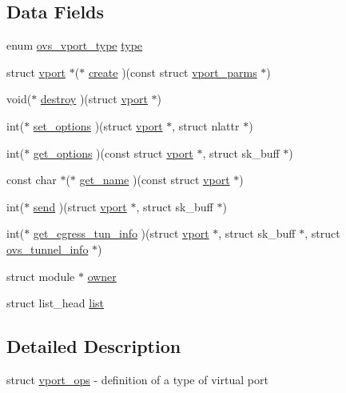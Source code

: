 \subsection*{Data Fields}
\begin{DoxyCompactItemize}
\item 
enum \hyperlink{openvswitch_8h_a9a1b861aa99bd83177a2b10b34745b0a}{ovs\+\_\+vport\+\_\+type} \hyperlink{structvport__ops_a7dd0d3776e78a2885063d3afd5e78148}{type}
\item 
struct \hyperlink{structvport}{vport} $\ast$($\ast$ \hyperlink{structvport__ops_acf3642d1a18755d25c37e9634c6945a2}{create} )(const struct \hyperlink{structvport__parms}{vport\+\_\+parms} $\ast$)
\item 
void($\ast$ \hyperlink{structvport__ops_a4fd321083545d82f308dc78331649632}{destroy} )(struct \hyperlink{structvport}{vport} $\ast$)
\item 
int($\ast$ \hyperlink{structvport__ops_a2a99b53de4cfaeaf8fb88d41660f5e73}{set\+\_\+options} )(struct \hyperlink{structvport}{vport} $\ast$, struct nlattr $\ast$)
\item 
int($\ast$ \hyperlink{structvport__ops_aacbd431343ae726a067b66b9b9de8ec4}{get\+\_\+options} )(const struct \hyperlink{structvport}{vport} $\ast$, struct sk\+\_\+buff $\ast$)
\item 
const char $\ast$($\ast$ \hyperlink{structvport__ops_abe0c3315271724bf05338487e0ced13c}{get\+\_\+name} )(const struct \hyperlink{structvport}{vport} $\ast$)
\item 
int($\ast$ \hyperlink{structvport__ops_a70034105b72fdde6d137bbc7e5d55a6a}{send} )(struct \hyperlink{structvport}{vport} $\ast$, struct sk\+\_\+buff $\ast$)
\item 
int($\ast$ \hyperlink{structvport__ops_a80a9e57f33d01dceca77f83fd3b88d23}{get\+\_\+egress\+\_\+tun\+\_\+info} )(struct \hyperlink{structvport}{vport} $\ast$, struct sk\+\_\+buff $\ast$, struct \hyperlink{structovs__tunnel__info}{ovs\+\_\+tunnel\+\_\+info} $\ast$)
\item 
struct module $\ast$ \hyperlink{structvport__ops_a74f3e852dbe8137d21e87895bd5f94e9}{owner}
\item 
struct list\+\_\+head \hyperlink{structvport__ops_aa0eadb49f41db4919e247ce17dd77aed}{list}
\end{DoxyCompactItemize}


\subsection{Detailed Description}
struct \hyperlink{structvport__ops}{vport\+\_\+ops} -\/ definition of a type of virtual port

